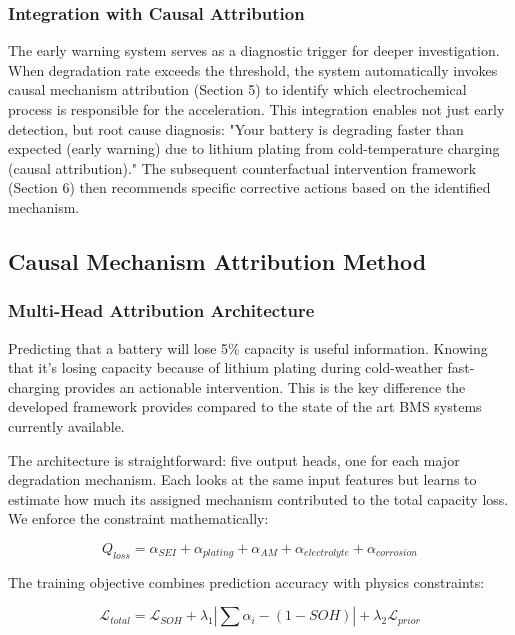 \documentclass[5p,times,authoryear]{elsarticle}
\begin{document}
\subsubsection{Integration with Causal Attribution}

The early warning system serves as a diagnostic trigger for deeper investigation. When degradation rate exceeds the threshold, the system automatically invokes causal mechanism attribution (Section 5) to identify which electrochemical process is responsible for the acceleration. This integration enables not just early detection, but root cause diagnosis: "Your battery is degrading faster than expected (early warning) due to lithium plating from cold-temperature charging (causal attribution)." The subsequent counterfactual intervention framework (Section 6) then recommends specific corrective actions based on the identified mechanism.



\subsection{Causal Mechanism Attribution Method}



\subsubsection{Multi-Head Attribution Architecture}

Predicting that a battery will lose 5\% capacity is useful information. Knowing that it's losing capacity because of lithium plating during cold-weather fast-charging provides an actionable intervention. This is the key difference the developed framework provides compared to the state of the art BMS systems currently available.

The architecture is straightforward: five output heads, one for each major degradation mechanism. Each looks at the same input features but learns to estimate how much its assigned mechanism contributed to the total capacity loss. We enforce the constraint mathematically:

\begin{equation}
Q_{loss} = \alpha_{SEI} + \alpha_{plating} + \alpha_{AM} + \alpha_{electrolyte} + \alpha_{corrosion}
\end{equation}

The training objective combines prediction accuracy with physics constraints:

\begin{equation}
\mathcal{L}_{total} = \mathcal{L}_{SOH} + \lambda_1 \left| \sum \alpha_i - (1 - SOH) \right| + \lambda_2 \mathcal{L}_{prior}
\end{equation}
\end{document}
